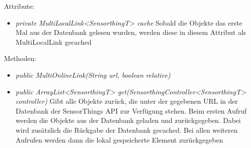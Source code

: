 Attribute:
\begin{itemize}
    \item \emph{private MultiLocalLink<SensorthingT> cache} Sobald die Objekte das erste Mal aus der Datenbank gelesen wurden, werden diese in diesem Attribut als MultiLocalLink gecached
\end{itemize}
Methoden:
\begin{itemize}
    \item \emph{public MultiOnlineLink(String url, boolean relative)}
    \relativeDescription
    \item \emph{public ArrayList<SensorthingT> get(SensorthingController<SensorthingT> controller)}
    Gibt alle Objekte zurück, die unter der gegebenen URL in der Datenbank der \gls{SensorThings API} zur Verfügung stehen.
    Beim ersten Aufruf werden die Objekte aus der Datenbank geladen und zurückgegeben.
    Dabei wird zusätzlich die Rückgabe der Datenbank gecached.
    Bei allen weiteren Aufrufen werden dann die lokal gespeicherte Element zurückgegeben
\end{itemize}
